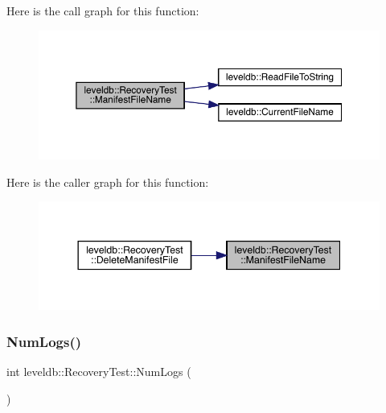 Here is the call graph for this function\+:
\nopagebreak
\begin{figure}[H]
\begin{center}
\leavevmode
\includegraphics[width=350pt]{classleveldb_1_1_recovery_test_a544166c64a5b786612230973ce510eaa_cgraph}
\end{center}
\end{figure}
Here is the caller graph for this function\+:
\nopagebreak
\begin{figure}[H]
\begin{center}
\leavevmode
\includegraphics[width=344pt]{classleveldb_1_1_recovery_test_a544166c64a5b786612230973ce510eaa_icgraph}
\end{center}
\end{figure}
\mbox{\label{classleveldb_1_1_recovery_test_af02345905fe0db242ae9d68c2536cc4b}} 
\subsubsection{\texorpdfstring{NumLogs()}{NumLogs()}}
{\footnotesize\ttfamily int leveldb\+::\+Recovery\+Test\+::\+Num\+Logs (\begin{DoxyParamCaption}{ }\end{DoxyParamCaption})\hspace{0.3cm}{\ttfamily [inline]}}

